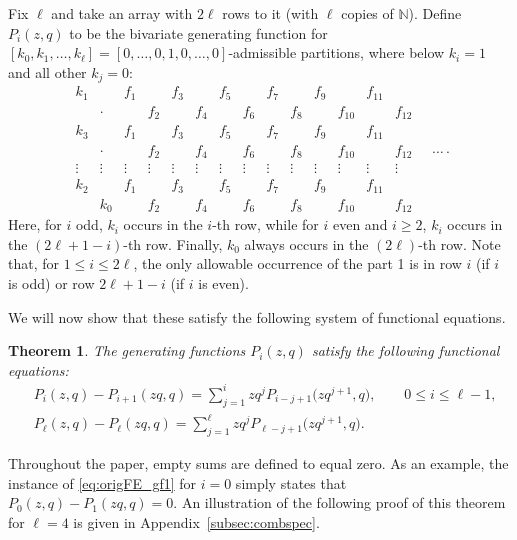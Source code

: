 \documentclass[pdftex]{sigma}
\numberwithin{equation}{section}
\newtheorem{Theorem}{Theorem}[section]
\theoremstyle{definition}
\newcommand{\NN}{\mathbb{N}}
\begin{document}
Fix $\ell$ and take an array with $2\ell$ rows to it (with $\ell$ copies of $\NN$). Define $P_i(z,q)$ to be the bivariate generating function for $[k_0,k_1,\dots,k_\ell]=[0,\dots,0,1,0,\dots,0]$-admissible partitions, where below $k_i=1$ and all other $k_j=0$:
\begin{equation*}
\begin{matrix}
k_1 && f_1 && f_3 && f_5 && f_7 && f_9 && f_{11} & \\
& \cdot && f_2 && f_4 && f_6 && f_8 && f_{10} && f_{12}\\
k_3 &&f_1 && f_3 && f_5 && f_7 && f_9 && f_{11} & \\
& \cdot && f_2 && f_4 && f_6 && f_8 && f_{10} && f_{12}\\
\vdots & \vdots &\vdots& \vdots &\vdots& \vdots &\vdots& \vdots &\vdots& \vdots &\vdots& \vdots&\vdots& \vdots\\
k_2 && f_1 && f_3 && f_5 && f_7 && f_9 && f_{11} & \\
& k_0 && f_2 && f_4 && f_6 && f_8 && f_{10} && f_{12}
 \end{matrix}\quad\dots\,.
\end{equation*}
Here, for $i$ odd, $k_i$ occurs in the $i$-th row, while for $i$ even and $i\ge 2$, $k_i$ occurs in the $(2\ell+1-i)$-th row. Finally, $k_0$ always occurs in the $(2\ell)$-th row. Note that, for $1 \le i \le 2\ell$, the only allowable occurrence of the part 1 is in row $i$ (if $i$ is odd) or row $2\ell+1-i$ (if $i$ is even).

We will now show that these satisfy the following system of functional equations.
\begin{Theorem} \label{thm:funceq1A}
The generating functions $P_i(z,q)$ satisfy the following functional equations:
\begin{align}
&P_i(z,q) - P_{i+1}(zq,q)= \sum_{j=1}^i zq^j P_{i-j+1}\bigl(zq^{j+1},q\bigr), \qquad 0 \le i \le \ell-1, \label{eq:origFE_gf1} \\
&P_\ell(z,q) - P_\ell(zq,q)= \sum_{j=1}^\ell zq^j P_{\ell-j+1}\bigl(zq^{j+1},q\bigr). \label{eq:origFE_gf2}
\end{align}
\end{Theorem}
Throughout the paper, empty sums are defined to equal zero. As an example, the instance of \eqref{eq:origFE_gf1} for $i=0$ simply states that $P_0(z,q)-P_1(zq,q)=0$. An illustration of the following proof of this theorem for $\ell=4$ is given in Appendix~\ref{subsec:combspec}.
\end{document}
